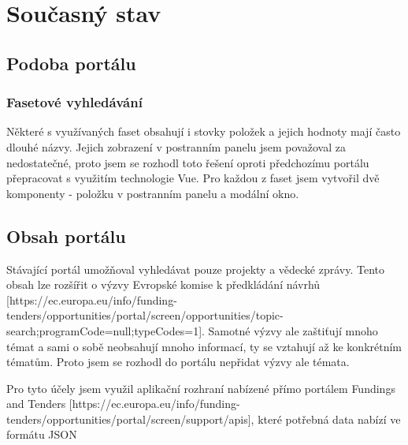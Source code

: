 \chapter{Současný stav}

\section{Podoba portálu}

\subsection{Fasetové vyhledávání}
Některé s využívaných faset obsahují i stovky položek a jejich hodnoty mají často dlouhé názvy. Jejich zobrazení v postranním panelu jsem považoval za nedostatečné, proto jsem se rozhodl toto řešení oproti předchozímu portálu přepracovat s využitím technologie Vue. Pro každou z faset jsem vytvořil dvě komponenty - položku v postranním panelu a modální okno.

\section{Obsah portálu}
Stávající portál umožňoval vyhledávat pouze projekty a vědecké zprávy. Tento obsah lze rozšířit o výzvy Evropské komise k předkládání návrhů [https://ec.europa.eu/info/funding-tenders/opportunities/portal/screen/opportunities/topic-search;programCode=null;typeCodes=1]. Samotné výzvy ale zaštiťují mnoho témat a sami o sobě neobsahují mnoho informací, ty se vztahují až ke konkrétním tématům. Proto jsem se rozhodl do portálu nepřidat výzvy ale témata.

Pro tyto účely jsem využil aplikační rozhraní nabízené přímo portálem Fundings and Tenders [https://ec.europa.eu/info/funding-tenders/opportunities/portal/screen/support/apis], které potřebná data nabízí ve formátu JSON